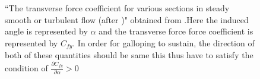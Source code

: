 \begin{figure}
	
  \setlength{\unitlength}{\textwidth}

  \caption{ ``The transverse force coefficient for various sections in steady smooth or turbulent flow (after \citet{Blevins1990})" obtained from \citet{Paidoussis2010}.Here the induced angle is represented by $\alpha$ and the transverse force force coefficient is represented by $C_{fy}$. In order for galloping to sustain, the direction of both of these quantities should be same this thus have to satisfy the condition of $\frac{\partial C_{fy}}{\partial \alpha } >0$}
    \label{fig:par_diff_cross_sec}
\end{figure}

